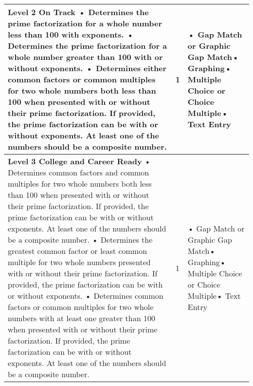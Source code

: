 \documentclass[11pt, English]{article}
\begin{document}
\begin{longtable}{|p{11.0cm}|p{1.8cm}|p{3.7cm}|}
\textbf{Level 2 On Track}\newline
• Determines the prime factorization for a whole number less than 100 with exponents. \newline• Determines the prime factorization for a whole number greater than 100 with or without exponents. \newline• Determines either common factors or common multiples for two whole numbers both less than 100 when presented with or without their prime factorization. If provided, the prime factorization can be with or without exponents. At least one of the numbers should be a composite number. \newline

 & \hfil{1}
 &• Gap Match or Graphic Gap Match\newline• Graphing\newline• Multiple Choice or Choice Multiple\newline• Text Entry\\
\hline


 
\textbf{Level 3 College and Career Ready}\newline
• Determines common factors and common multiples for two whole numbers both less than 100 when presented with or without their prime factorization. If provided, the prime factorization can be with or without exponents. At least one of the numbers should be a composite number. \newline• Determines the greatest common factor or least common multiple for two whole numbers presented with or without their prime factorization. If provided, the prime factorization can be with or without exponents. \newline• Determines common factors or common multiples for two whole numbers with at least one greater than 100 when presented with or without their prime factorization. If provided, the prime factorization can be with or without exponents. At least one of the numbers should be a composite number. \newline

& \hfil{1}
&• Gap Match or Graphic Gap Match\newline• Graphing\newline• Multiple Choice or Choice Multiple\newline• Text Entry\\
\hline 


\end{longtable}
\end{document}
